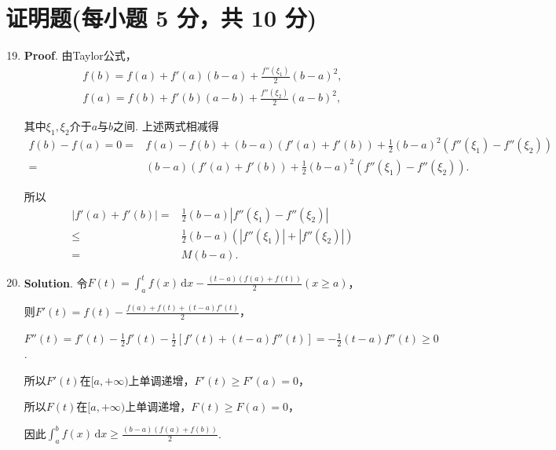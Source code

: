 \documentclass[../Main.tex]{subfiles}
\begin{document}
\section{证明题(每小题 5 分，共 10 分)}
\begin{enumerate}
    \setcounter{enumi}{18}
    \item \textbf{Proof}. 由Taylor公式，
          \[
              \begin{gathered}
                  f(b)=f(a)+f'(a)(b-a)+\frac{f''(\xi_{1})}{2}(b-a)^2, \\
                  f(a)=f(b)+f'(b)(a-b)+\frac{f''(\xi_{2})}{2}(a-b)^2,
              \end{gathered}
          \]

          其中$\xi_{1},\xi_{2}$介于$a$与$b$之间. 上述两式相减得
          \[
              \begin{aligned}
                  f(b)-f(a) = 0 = & f(a)-f(b) + (b-a)(f'(a)+f'(b)) + \frac{1}{2}(b-a)^{2}(f''(\xi_{1})-f''(\xi_{2})) \\
                  =               & (b-a)(f'(a)+f'(b)) + \frac{1}{2}(b-a)^{2}(f''(\xi_{1})-f''(\xi_{2})).
              \end{aligned}
          \]

          所以
          \[
              \begin{aligned}
                  |f'(a)+f'(b)| = & \frac{1}{2}(b-a)|f''(\xi_{1})-f''(\xi_{2})|     \\
                  \leq            & \frac{1}{2}(b-a)(|f''(\xi_{1})|+|f''(\xi_{2})|) \\
                  =               & M(b-a).
              \end{aligned}
          \]

    \item \textbf{Solution}. 令$F(t)=\int_{a}^{t}f(x)\,\mathrm{d}x-\frac{(t-a)(f(a)+f(t))}{2}
              (x\geq a)$，

          则$F'(t)=f(t)-\frac{f(a)+f(t)+(t-a)f'(t)}{2}$，

          $F''(t)=f'(t)-\frac{1}{2}f'(t)-\frac{1}{2}\left[f'(t)+(t-a)f''(t)\right]=-\frac{1}{2}
              (t-a)f''(t)\geq 0$.

          所以$F'(t)$在$[a,+\infty)$上单调递增，$F'(t)\geq F'(a)=0$，

          所以$F(t)$在$[a,+\infty)$上单调递增，$F(t)\geq F(a)=0$，

          因此$\int_{a}^{b}f(x)\,\mathrm{d}x \geq \frac{(b-a)(f(a)+f(b))}{2}$.
\end{enumerate}
\end{document}

